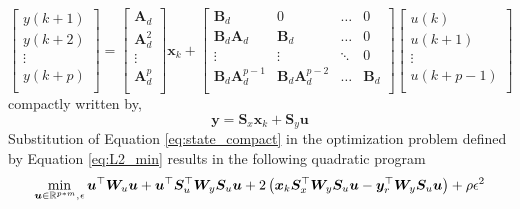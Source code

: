 \begin{equation}\label{eq:state_eq_comb}
    \begin{bmatrix}
    y(k+1)\\
    y(k+2)\\
    \vdots \\
    y(k+p)\\
    \end{bmatrix} =
    \begin{bmatrix}
    \boldsymbol{A}_d\\
    \boldsymbol{A}^2_d\\
    \vdots \\
    \boldsymbol{A}^p_d\\
    \end{bmatrix} \boldsymbol{x}_k +
    \begin{bmatrix}
    \boldsymbol{B}_d & 0 & \hdots & 0\\
    \boldsymbol{B}_d\boldsymbol{A}_d & \boldsymbol{B}_d & \hdots & 0 \\
    \vdots & \vdots & \ddots & 0\\
    \boldsymbol{B}_d\boldsymbol{A}^{p-1}_d & \boldsymbol{B}_d\boldsymbol{A}^{p-2}_d & \hdots & \boldsymbol{B}_d\\
    \end{bmatrix}\begin{bmatrix}
    u(k)\\
    u(k+1)\\
    \vdots \\
    u(k+p-1)\\
    \end{bmatrix}
\end{equation}
compactly written by,
\begin{equation}\label{eq:state_compact}
   \boldsymbol{y}  = \boldsymbol{S}_x \boldsymbol{x}_k + \boldsymbol{S}_y \boldsymbol{u}
\end{equation}
Substitution of Equation \ref{eq:state_compact} in the optimization problem defined by Equation \ref{eq:L2_min} results in the following quadratic program
\begin{equation}\label{eq:QP_aug_inp}
    \min_{\boldsymbol{u}\in \mathbb{R}^{p*m}, \nspace{1}\epsilon} \boldsymbol{u}^{\top}\boldsymbol{W}_u\boldsymbol{u} + \boldsymbol{u}^{\top}\boldsymbol{S}^{\top}_u\boldsymbol{W}_y\boldsymbol{S}_u\boldsymbol{u} + 2\left( \boldsymbol{x}_k\boldsymbol{S}^{\top}_x\boldsymbol{W}_y\boldsymbol{S}_u\boldsymbol{u} - \boldsymbol{y}^{\top}_r\boldsymbol{W}_y\boldsymbol{S}_u\boldsymbol{u}\right) + \rho \epsilon^2
\end{equation}
